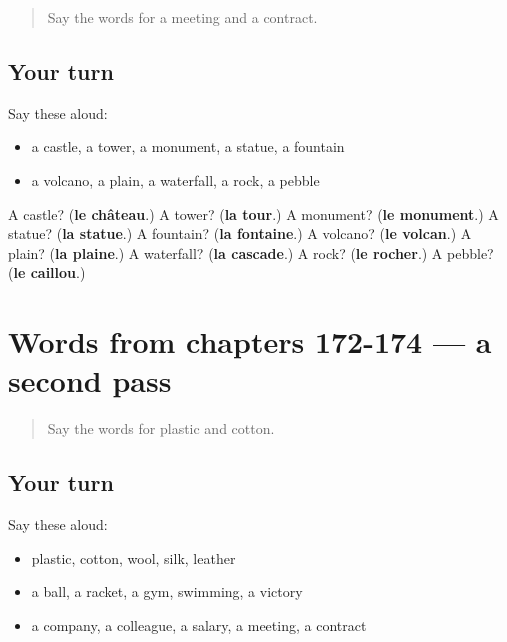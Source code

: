 \label{lesson:FR-R174-first-pass-words-from-chapters-170-171}



\begin{quote}
Say the words for a meeting and a contract.
\end{quote}

\subsection*{Your turn}
Say these aloud:

\begin{itemize}
\raggedright
  \item a castle, a tower, a monument, a statue, a fountain
  \item a volcano, a plain, a waterfall, a rock, a pebble
\end{itemize}

\begin{tcolorbox}[breakable,colback=teal!4,colframe=teal!35!black,title={Before you move on}]
A castle? (\textbf{le château}.) A tower? (\textbf{la tour}.) A monument? (\textbf{le monument}.) A statue? (\textbf{la statue}.) A fountain? (\textbf{la fontaine}.) A volcano? (\textbf{le volcan}.) A plain? (\textbf{la plaine}.) A waterfall? (\textbf{la cascade}.) A rock? (\textbf{le rocher}.) A pebble? (\textbf{le caillou}.)
\end{tcolorbox}
\section[(dialogue)]{Words from chapters 172-174 — a second pass}

\label{lesson:FR-R174-second-pass-words-from-chapters-172-174}



\begin{quote}
Say the words for plastic and cotton.
\end{quote}

\subsection*{Your turn}
Say these aloud:

\begin{itemize}
\raggedright
  \item plastic, cotton, wool, silk, leather
  \item a ball, a racket, a gym, swimming, a victory
  \item a company, a colleague, a salary, a meeting, a contract
\end{itemize}

